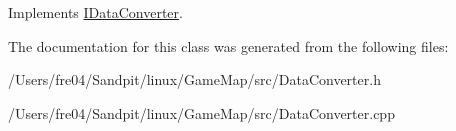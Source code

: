 Implements \hyperlink{class_i_data_converter_a358ecdbe04ae180f7e0bb68c0fa141c9}{I\+Data\+Converter}.



The documentation for this class was generated from the following files\+:\begin{DoxyCompactItemize}
\item 
/\+Users/fre04/\+Sandpit/linux/\+Game\+Map/src/Data\+Converter.\+h\item 
/\+Users/fre04/\+Sandpit/linux/\+Game\+Map/src/Data\+Converter.\+cpp\end{DoxyCompactItemize}
